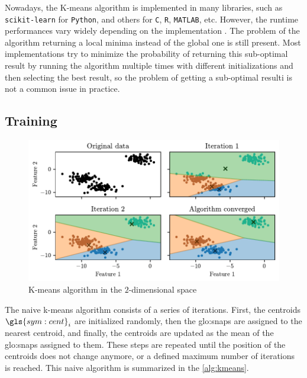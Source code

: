 Nowadays, the K-means algorithm is implemented in many libraries, such as \texttt{scikit-learn} for \texttt{Python}, and others for \texttt{C}, \texttt{R}, \texttt{MATLAB}, etc. However, the runtime performances vary widely depending on the implementation \cite{Kmeans-performances-Kriegel2017}. The problem of the algorithm returning a local minima instead of the global one is still present. Most implementations try to minimize the probability of returning this sub-optimal result by running the algorithm multiple times with different initializations and then selecting the best result, so the problem of getting a sub-optimal resulti is not a common issue in practice.

\subsection{Training}

\begin{figure}[htbp]
  \centering
  \includegraphics[width=\textwidth]{images/Kmeans_vornoi.pdf}
  \caption{K-means algorithm in the $2$-dimensional space}
  \label{fig:kmeans_vornoi}
\end{figure}

 The naive k-means algorithm consists of a series of iterations. First, the centroids $\gls{sym:cent}_i$ are initialized randomly, then the {\gls{glo:snap}}s are assigned to the nearest centroid, and finally, the centroids are updated as the mean of the {\gls{glo:snap}}s assigned to them. These steps are repeated until the position of the centroids does not change anymore, or a defined maximum number of iterations is reached. This naive algorithm is summarized in the \autoref{alg:kmeans}.

